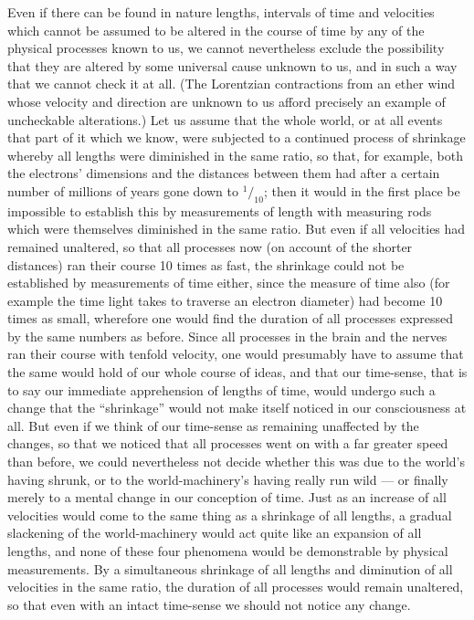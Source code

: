 \documentclass[12pt,a4paper]{article}
\begin{document}
Even if there can be found in nature lengths, intervals of time and velocities
which cannot be assumed to be altered in the course of time by any of the
physical processes known to us, we cannot nevertheless exclude the possibility
that they are altered by some universal cause unknown to us, and in such a way
that we cannot check it at all. (The Lorentzian contractions from an ether
wind whose velocity and direction are unknown to us afford precisely an
example of uncheckable alterations.) Let us assume that the whole world, or at
all events that part of it which we know, were subjected to a continued
process of shrinkage whereby all lengths were diminished in the same ratio, so
that, for example, both the electrons' dimensions and the distances between
them had after a certain number of millions of years gone down to
$^{1}\!/_{10}$; then it would in the first place be impossible to establish
this by measurements of length
with measuring rods which were themselves diminished in the same ratio. But
even if all velocities had remained unaltered, so that all processes now (on
account of the shorter distances) ran their course 10 times as fast, the
shrinkage could not be established by measurements of time either, since the
measure of time also (for example the time light takes to traverse an electron
diameter) had become 10 times as small, wherefore one would find the duration
of all processes expressed by the same numbers as before. Since all processes
in the brain and the nerves ran their course with tenfold velocity, one would
presumably have to assume that the same would hold of our whole course of
ideas, and that our time-sense, that is to say our immediate apprehension of
lengths of time, would undergo such a change that the ``shrinkage'' would not
make itself noticed in our consciousness at all. But even if we think of our
time-sense as remaining unaffected by the changes, so that we noticed that all
processes went on with a far greater speed than before, we could nevertheless
not decide whether this was due to the world's having shrunk, or to the
world-machinery's having really run wild --- or finally merely to a mental
change in our conception of time. Just as an increase of all velocities would
come to the same thing as a shrinkage of all lengths, a gradual slackening of
the world-machinery would act quite like an expansion of all lengths, and none
of these four phenomena would be demonstrable by physical measurements. By a
simultaneous shrinkage of all lengths and diminution of all velocities in the
same ratio, the duration of all processes would remain unaltered, so that even
with an intact time-sense we should not notice any change.
\end{document}
